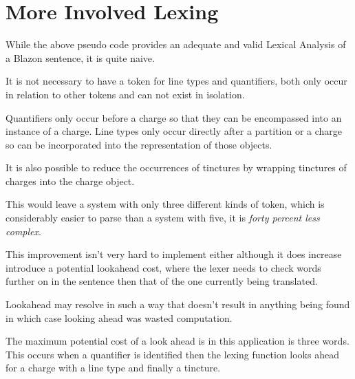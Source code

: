\section{More Involved Lexing}

While the above pseudo code provides an adequate and valid Lexical Analysis of a Blazon sentence, it is quite naive.  

It is not necessary to have a token for line types and quantifiers, both only occur in relation to other tokens and can not exist in isolation.

Quantifiers only occur before a charge so that they can be encompassed into an instance of a charge. Line types only occur directly after a partition or a charge so can be incorporated into the representation of those objects.

It is also possible to reduce the occurrences of tinctures by wrapping tinctures of charges into the charge object. 

This would leave a system with only three different kinds of token, which is considerably easier to parse than a system with five, it is \emph{forty percent less complex}.  

This improvement isn't very hard to implement either although it does increase introduce a potential lookahead cost, where the lexer needs to check words further on in the sentence then that of the one currently being translated. 

Lookahead may resolve in such a way that doesn't result in anything being found in which case looking ahead was wasted computation. 

The maximum potential cost of a look ahead is in this application is three words.  This occurs when a quantifier is identified then the lexing function looks ahead for a charge with a line type and finally a tincture. 



